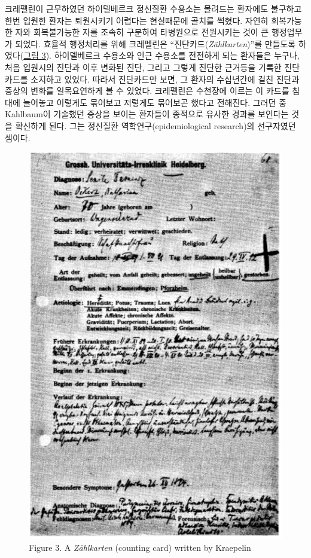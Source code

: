\documentclass[
]{article}
\begin{document}
크레펠린이 근무하였던 하이델베르크 정신질환 수용소는 몰려드는 환자에도
불구하고 한번 입원한 환자는 퇴원시키기 어렵다는 현실때문에 골치를
썩혔다. 자연히 회복가능한 자와 회복불가능한 자를 조속히 구분하여
타병원으로 전원시키는 것이 큰 행정업무가 되었다. 효율적 행정처리를 위해
크레펠린은 ``진단카드(\emph{Zählkarten})''를 만들도록
하였다(\protect\hyperlink{fig:zahlkarten}{그림 3}). 하이델베르크
수용소와 인근 수용소를 전전하게 되는 환자들은 누구나, 처음 입원시의
진단과 이후 변화된 진단, 그리고 그렇게 진단한 근거등을 기록한 진단카드를
소지하고 있었다. 따라서 진단카드만 보면, 그 환자의 수십년간에 걸친
진단과 증상의 변화를 일목요연하게 볼 수 있었다. 크레펠린은 수천장에
이르는 이 카드를 침대에 늘어놓고 이렇게도 묶어보고 저렇게도 묶어보곤
했다고 전해진다. 그러던 중 Kahlbaum이 기술했던 증상을 보이는 환자들이
종적으로 유사한 경과를 보인다는 것을 확신하게 된다. 그는 정신질환
역학연구(epidemiological research)의 선구자였던 셈이다.

\begin{figure}
\hypertarget{ZahlKarten}{%
\centering
\includegraphics{images/01-01/zahlkarten.jpg}
\caption{Figure 3. A \emph{Zählkarten} (counting card) written by
Kraepelin}\label{ZahlKarten}
}
\end{figure}
\end{document}
